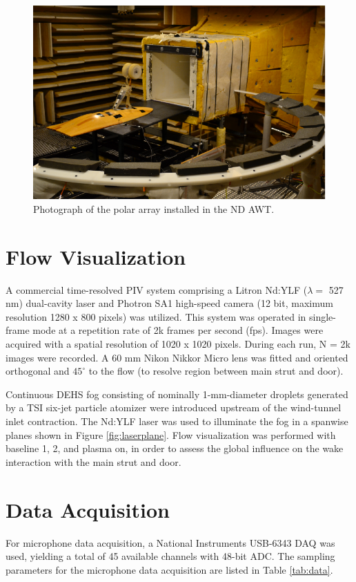 \begin{figure}
	\begin{center}
		\centerline{\includegraphics[scale=1.0]{figures/arraypic}}
		\caption{Photograph of the polar array installed in the ND AWT.}
		\label{fig:arraypic}
	\end{center}
\end{figure}

\section{Flow Visualization}
A commercial time-resolved PIV system comprising a Litron Nd:YLF ($\lambda =$ 527 nm) dual-cavity laser and Photron SA1 high-speed camera (12 bit, maximum resolution 1280 x 800 pixels) was utilized. This system was operated in single-frame mode at a repetition rate of 2k frames per second (fps). Images were acquired with a spatial resolution of 1020 x 1020 pixels. During each run, N = 2k images were recorded. A 60 mm Nikon Nikkor Micro lens was fitted and oriented orthogonal and $45^\circ$ to the flow (to resolve region between main strut and door).

Continuous DEHS fog consisting of nominally 1-mm-diameter droplets generated by a TSI six-jet particle atomizer were introduced upstream of the wind-tunnel inlet contraction. The Nd:YLF laser was used to illuminate the fog in a spanwise planes shown in Figure \ref{fig:laserplane}. Flow visualization was performed with baseline 1, 2, and plasma on, in order to assess the global influence on the wake interaction with the main strut and door. 

\section{Data Acquisition}
For microphone data acquisition, a National Instruments USB-6343 DAQ was used, yielding a total of 45 available channels with 48-bit ADC. The sampling parameters for the microphone data acquisition are listed in Table \ref{tab:data}.

